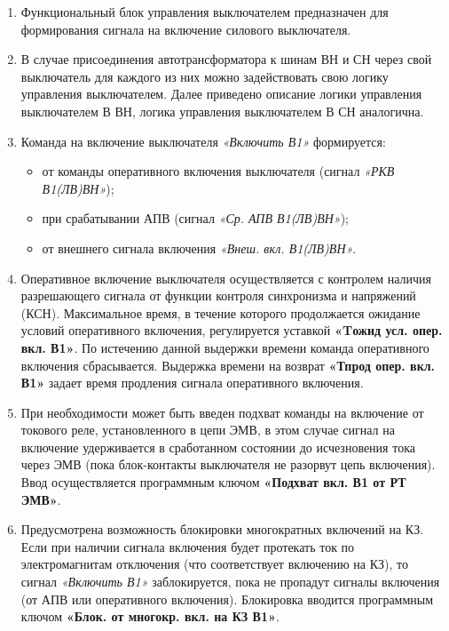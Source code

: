 \documentclass[a4paper, 12pt, table, hidelinks, DIV=calc]{extarticle}
\begin{document}
\begin{enumerate}[label=\arabic{section}.\arabic{subsection}.\arabic{subsubsection}.\arabic*,  align=left, labelsep=4pt, leftmargin=0pt, itemindent=57pt]

\item
Функциональный блок управления выключателем предназначен для формирования сигнала на включение силового выключателя. 

\item
В случае присоединения автотрансформатора к шинам ВН и СН через свой выключатель для каждого из них можно задействовать свою логику управления выключателем. Далее приведено описание логики управления выключателем В ВН, логика управления выключателем В СН аналогична.

\item
Команда на включение выключателя \textit{«Включить В1»} формируется:
\begin{itemize}
\item от команды оперативного включения выключателя (сигнал \textit{«РКВ В1(ЛВ)ВН»});
\item при срабатывании АПВ (сигнал \textit{«Ср. АПВ В1(ЛВ)ВН»}); 
\item от внешнего сигнала включения \textit{«Внеш. вкл. В1(ЛВ)ВН»}.
\end{itemize}

\item
Оперативное включение выключателя осуществляется с контролем наличия разрешающего сигнала от функции контроля синхронизма и напряжений (КСН). Максимальное время, в течение которого продолжается ожидание условий оперативного включения, регулируется уставкой \textbf{«Tожид усл. опер. вкл. В1»}. По истечению данной выдержки времени команда оперативного включения сбрасывается. Выдержка времени на возврат \textbf{«Тпрод опер. вкл. В1»} задает время продления сигнала оперативного включения.

\item
При необходимости может быть введен подхват команды на включение от токового реле, установленного в цепи ЭМВ, в этом случае сигнал на включение удерживается в сработанном состоянии до исчезновения тока через ЭМВ (пока блок-контакты выключателя не разорвут цепь включения). Ввод осуществляется программным ключом \textbf{«Подхват вкл. В1 от РТ ЭМВ»}. 

\item
Предусмотрена возможность блокировки многократных включений на КЗ. Если при наличии сигнала включения будет протекать ток по электромагнитам отключения (что соответствует включению на КЗ), то сигнал \textit{«Включить В1»} заблокируется, пока не пропадут сигналы включения (от АПВ или оперативного включения). Блокировка вводится программным ключом \textbf{«Блок. от многокр. вкл. на КЗ В1»}.


\end{enumerate}
\end{document}
